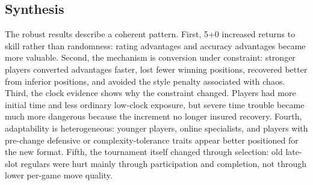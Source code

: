 \subsection{Synthesis}

The robust results describe a coherent pattern. First, 5+0 increased returns to skill rather than randomness: rating advantages and accuracy advantages became more valuable. Second, the mechanism is conversion under constraint: stronger players converted advantages faster, lost fewer winning positions, recovered better from inferior positions, and avoided the style penalty associated with chaos. Third, the clock evidence shows why the constraint changed. Players had more initial time and less ordinary low-clock exposure, but severe time trouble became much more dangerous because the increment no longer insured recovery. Fourth, adaptability is heterogeneous: younger players, online specialists, and players with pre-change defensive or complexity-tolerance traits appear better positioned for the new format. Fifth, the tournament itself changed through selection: old late-slot regulars were hurt mainly through participation and completion, not through lower per-game move quality.
